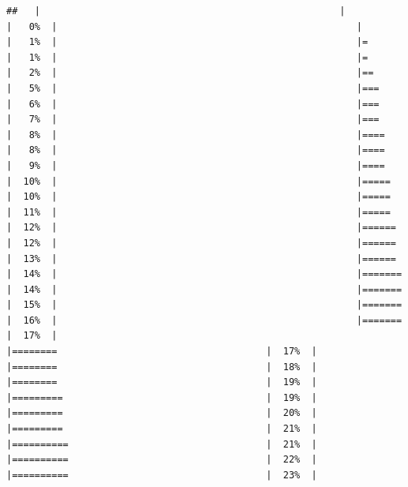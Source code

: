 \documentclass[
  krantz2]{krantz}
\begin{document}
\begin{verbatim}
##   |                                                     |                                             |   0%  |                                                     |                                             |   1%  |                                                     |=                                            |   1%  |                                                     |=                                            |   2%  |                                                     |==                                           |   5%  |                                                     |===                                          |   6%  |                                                     |===                                          |   7%  |                                                     |===                                          |   8%  |                                                     |====                                         |   8%  |                                                     |====                                         |   9%  |                                                     |====                                         |  10%  |                                                     |=====                                        |  10%  |                                                     |=====                                        |  11%  |                                                     |=====                                        |  12%  |                                                     |======                                       |  12%  |                                                     |======                                       |  13%  |                                                     |======                                       |  14%  |                                                     |=======                                      |  14%  |                                                     |=======                                      |  15%  |                                                     |=======                                      |  16%  |                                                     |=======                                      |  17%  |                                                     |========                                     |  17%  |                                                     |========                                     |  18%  |                                                     |========                                     |  19%  |                                                     |=========                                    |  19%  |                                                     |=========                                    |  20%  |                                                     |=========                                    |  21%  |                                                     |==========                                   |  21%  |                                                     |==========                                   |  22%  |                                                     |==========                                   |  23%  |         
\end{verbatim}
\end{document}
